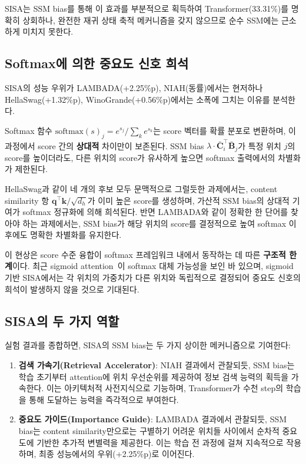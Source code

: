 \documentclass[11pt]{article}
\begin{document}
SISA는 SSM bias를 통해 이 효과를 부분적으로 획득하여 Transformer(33.31\%)를 명확히 상회하나, 완전한 재귀 상태 축적 메커니즘을 갖지 않으므로 순수 SSM에는 근소하게 미치지 못한다.

\subsection{Softmax에 의한 중요도 신호 희석}

SISA의 성능 우위가 LAMBADA(+2.25\%p), NIAH(동률)에서는 현저하나 HellaSwag(+1.32\%p), WinoGrande(+0.56\%p)에서는 소폭에 그치는 이유를 분석한다.

Softmax 함수 $\text{softmax}(s)_j = e^{s_j} / \sum_k e^{s_k}$는 score 벡터를 확률 분포로 변환하며, 이 과정에서 score 간의 \textbf{상대적} 차이만이 보존된다. SSM bias $\lambda \cdot \bar{\mathbf{C}}_i^\top \bar{\mathbf{B}}_j$가 특정 위치 $j$의 score를 높이더라도, 다른 위치의 score가 유사하게 높으면 softmax 출력에서의 차별화가 제한된다.

HellaSwag과 같이 네 개의 후보 모두 문맥적으로 그럴듯한 과제에서는, content similarity 항 $\mathbf{q}^\top \mathbf{k}/\sqrt{d_h}$가 이미 높은 score를 생성하며, 가산적 SSM bias의 상대적 기여가 softmax 정규화에 의해 희석된다. 반면 LAMBADA와 같이 정확한 한 단어를 찾아야 하는 과제에서는, SSM bias가 해당 위치의 score를 결정적으로 높여 softmax 이후에도 명확한 차별화를 유지한다.

이 현상은 score 수준 융합이 softmax 프레임워크 내에서 동작하는 데 따른 \textbf{구조적 한계}이다. 최근 sigmoid attention~\citep{sigmoid_attn}이 softmax 대체 가능성을 보인 바 있으며, sigmoid 기반 SISA에서는 각 위치의 가중치가 다른 위치와 독립적으로 결정되어 중요도 신호의 희석이 발생하지 않을 것으로 기대된다.

\subsection{SISA의 두 가지 역할}

실험 결과를 종합하면, SISA의 SSM bias는 두 가지 상이한 메커니즘으로 기여한다:

\begin{enumerate}[leftmargin=*]
\item \textbf{검색 가속기(Retrieval Accelerator)}: NIAH 결과에서 관찰되듯, SSM bias는 학습 초기부터 attention에 위치 우선순위를 제공하여 정보 검색 능력의 획득을 가속한다. 이는 아키텍처적 사전지식으로 기능하며, Transformer가 수천 step의 학습을 통해 도달하는 능력을 즉각적으로 부여한다.

\item \textbf{중요도 가이드(Importance Guide)}: LAMBADA 결과에서 관찰되듯, SSM bias는 content similarity만으로는 구별하기 어려운 위치들 사이에서 순차적 중요도에 기반한 추가적 변별력을 제공한다. 이는 학습 전 과정에 걸쳐 지속적으로 작용하며, 최종 성능에서의 우위(+2.25\%p)로 이어진다.
\end{enumerate}
\end{document}
